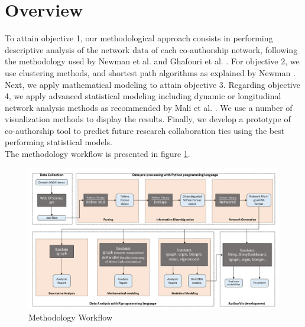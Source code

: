 


\section{Overview}
To attain objective 1, our methodological approach consists in performing descriptive analysis of the network data of each co-authorship network, following the methodology used by Newman et al. \cite{newman_structure_2001} and Ghafouri et al. \cite{ghafouri_social_2014}. For objective 2, we use clustering methods, and shortest path algorithms as explained by Newman \cite{newman_scientific_2001,newman_scientific_2001-1}. Next, we apply mathematical modeling to attain objective 3. Regarding objective 4, we apply advanced statistical modeling including dynamic or longitudinal network analysis methods as recommended by Mali et al. \cite{mali_dynamic_2012}. We use a number of visualization methods to display the results. Finally, we develop a prototype of co-authorship tool to predict future research collaboration ties using the best performing statistical models. \\
The methodology workflow is presented in figure \ref{method_overview}.%

\begin{figure}
\centering
\includegraphics[scale=0.68]{Chapters/method_diagram}
\caption{Methodology Workflow}
\label{method_overview}
\end{figure}

